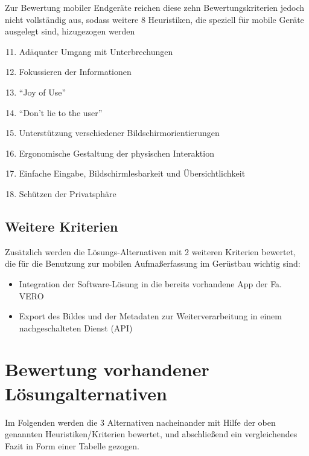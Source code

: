 Zur Bewertung mobiler Endgeräte reichen diese zehn Bewertungskriterien jedoch nicht vollständig aus, sodass weitere 8 Heuristiken, die speziell für mobile Geräte ausgelegt sind, hizugezogen werden 

\begin{enumerate}
	\setcounter{enumi}{10}
	\item \label{itm:11} Adäquater Umgang mit Unterbrechungen
	\item \label{itm:12} Fokussieren der Informationen
	\item \label{itm:13} ``Joy of Use''
	\item \label{itm:14} ``Don't lie to the user''
	\item \label{itm:15} Unterstützung verschiedener Bildschirmorientierungen
	\item \label{itm:16} Ergonomische Gestaltung der physischen Interaktion
	\item \label{itm:17} Einfache Eingabe, Bildschirmlesbarkeit und Übersichtlichkeit
	\item \label{itm:18} Schützen der Privatsphäre
\end{enumerate}

\subsection{Weitere Kriterien}
Zusätzlich werden die Lösungs-Alternativen mit 2 weiteren Kriterien bewertet, die für die Benutzung zur mobilen Aufmaßerfassung im Gerüstbau wichtig sind:

\begin{itemize}
	\item \label{itm:integration} Integration der Software-Lösung in die bereits vorhandene App der Fa. VERO
	\item \label{itm:export} Export des Bildes und der Metadaten zur Weiterverarbeitung in einem nachgeschalteten Dienst (API)
\end{itemize}

\section{Bewertung vorhandener Lösungalternativen}

Im Folgenden werden die 3 Alternativen nacheinander mit Hilfe der oben genannten Heuristiken/Kriterien bewertet, und abschließend ein vergleichendes Fazit in Form einer Tabelle  gezogen.

